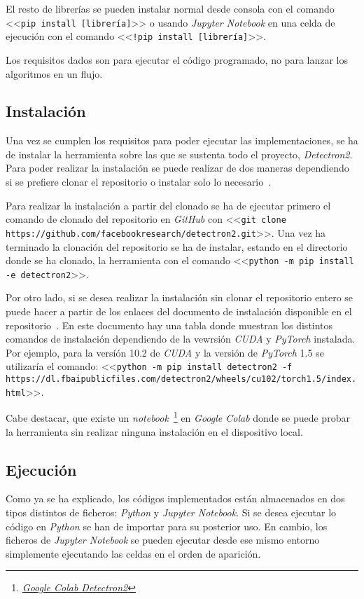 El resto de librerías se pueden instalar normal desde consola con el comando <<\texttt{pip install [librería]}>> o usando \textit{Jupyter Notebook} en una celda de ejecución con el comando <<\texttt{!pip install [librería]}>>.

Los requisitos dados son para ejecutar el código programado, no para lanzar los algoritmos en un flujo.

\subsection{Instalación}
Una vez se cumplen los requisitos para poder ejecutar las implementaciones, se ha de instalar la herramienta sobre las que se sustenta todo el proyecto, \textit{Detectron2}. Para poder realizar la instalación se puede realizar de dos maneras dependiendo si se prefiere clonar el repositorio o instalar solo lo necesario~\cite{inst}.

Para realizar la instalación a partir del clonado se ha de ejecutar primero el comando de clonado del repositorio en \textit{GitHub} con <<\texttt{git clone https://github.com/facebookresearch/detectron2.git}>>. Una vez ha terminado la clonación del repositorio se ha de instalar, estando en el directorio donde se ha clonado, la herramienta con el comando <<\texttt{python -m pip install -e detectron2}>>.

Por otro lado, si se desea realizar la instalación sin clonar el repositorio entero se puede hacer a partir de los enlaces del documento de instalación disponible en el repositorio~\cite{inst}. En este documento hay una tabla donde muestran los distintos comandos de instalación dependiendo de la vewrsión \textit{CUDA} y \textit{PyTorch} instalada. Por ejemplo, para la versíón 10.2 de \textit{CUDA} y la versión de \textit{PyTorch} 1.5 se utilizaría el comando: <<\texttt{python -m pip install detectron2 -f https://dl.fbaipublicfiles.com/detectron2/wheels/cu102/torch1.5/index.html}>>.

Cabe destacar, que existe un \textit{notebook}~\footnote{\href{https://colab.research.google.com/drive/16jcaJoc6bCFAQ96jDe2HwtXj7BMD_-m5}{\textit{Google Colab Detectron2}}} en \textit{Google Colab} donde se puede probar la herramienta sin realizar ninguna instalación en el dispositivo local.

\subsection{Ejecución}
Como ya se ha explicado, los códigos implementados están almacenados en dos tipos distintos de ficheros: \textit{Python} y \textit{Jupyter Notebook}. Si se desea ejecutar lo código en \textit{Python} se han de importar para su posterior uso. En cambio, los ficheros de \textit{Jupyter Notebook} se pueden ejecutar desde ese mismo entorno simplemente ejecutando las celdas en el orden de aparición.

